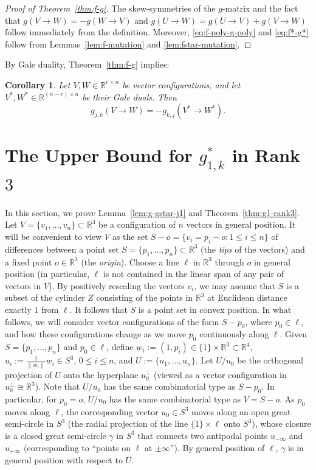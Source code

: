 \documentclass[11pt]{article}
\newtheorem{corollary}[theorem]{Corollary}
\renewcommand{\leq}{\leqslant}
\newcommand{\R}{\mathbb{R}}
\begin{document}
%
\begin{proof}[Proof of Theorem~\ref{thm:f-g}]
The skew-symmetries of the $g$-matrix and the fact that $g(V\to W)=-g(W\to V)$ and $g(U\to W)=g(U\to V)+g(V\to W)$ follow immediately from the definition. Moreover, \eqref{eq:f-poly-g-poly} and \eqref{eq:f*-g*} follow from Lemmas~\ref {lem:f-mutation} and \ref{lem:fstar-mutation}.
\end{proof}
%
By Gale duality, Theorem~\ref{thm:f-g} implies:
\begin{corollary} Let $V,W\in \R^{r\times n}$ be vector configurations, and let $V^*,W^*\in  \R^{(n-r)\times n}$ be their Gale duals. Then
\label{cor:g-pair-dual}
\[ g_{j,k}(V \to W) = -g_{k,j}(V^* \to W^*).\]
\end{corollary}
%
\section{The Upper Bound for $g_{1,k}^*$ in Rank $3$}
\label{sec:g1-arcs}
In this section, we prove Lemma~\ref{lem:g-gstar-j1}  and Theorem~\ref{thm:g1-rank3}.
Let $V=\{v_1,\dots,v_n\}\subset \R^3$ be a configuration of $n$ vectors in general position.  It will be convenient to view $V$ as the set $S-o=\{v_i=p_i-o\colon 1\leq i\leq n\}$ of differences between a point set $S=\{p_1,\dots,p_n\} \subset \R^3$ (the \emph{tips} of the vectors) and a fixed point $o\in \R^3$ (the \emph{origin}). 
%
Choose a line $\ell$ in $\R^3$ through $o$ in general position (in particular, $\ell$ is not contained in the linear span of any pair of vectors in $V$). By positively rescaling the vectors $v_i$, 
we may assume that $S$ is a subset of the cylinder  $Z$ consisting of the points in $\R^3$ at Euclidean distance exactly $1$ from $\ell$. It follows that $S$ is a point set in convex position.
%
In what follows, we will consider vector configurations of the form $S-p_0$, where $p_0\in \ell$, and how these configurations change as we move $p_0$ continuously along $\ell$. 
Given $S=\{p_1,\dots,p_n\}$ and $p_0\in \ell$, define $w_i:=(1,p_i) \in \{1\}\times \R^3 \subset \R^4$, $u_i:=\frac{1}{\|w_i\|}w_i \in S^3$, $0\leq i\leq n$, and $U:=\{u_1,\dots, u_n\}$. Let $U/u_0$ be the orthogonal projection of $U$ onto the hyperplane $u_0^\bot$ (viewed as a vector configuration in $u_0^\bot\cong \R^3$). Note that $U/u_0$ has the same combinatorial type as $S-p_0$. In particular, for $p_0=o$, $U/u_0$ has the same combinatorial type as $V=S-o$.
As $p_0$ moves along $\ell$, the corresponding vector $u_0 \in S^3$ moves along an open great semi-circle in $S^3$ (the radial projection of the line $\{1\}\times \ell$ onto $S^3$), whose closure is a closed great semi-circle $\gamma$ in $S^3$ that connects two antipodal points $u_{-\infty}$ and $u_{+\infty}$ (corresponding to ``points on $\ell$ at $\pm \infty$''). By general position of $\ell$, $\gamma$ is in general position with respect to $U$.
\end{document}
